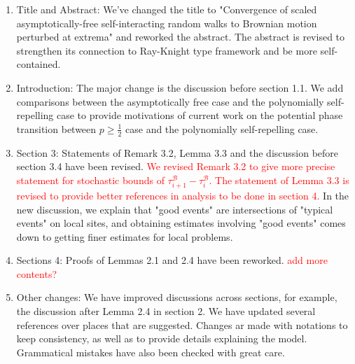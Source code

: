 \documentclass[11pt,a4paper]{article}
\numberwithin{equation}{section}
\def\TBF#1{\textcolor{red}{#1}} %
\begin{document}
	\begin{enumerate}
		\item Title and Abstract: We've changed the title to "Convergence of scaled asymptotically-free
		self-interacting random walks to Brownian motion
		perturbed at extrema" and reworked the abstract. The abstract is revised to strengthen its connection to Ray-Knight type framework and be more self-contained.
		
		\item Introduction: The major change is the discussion before section 1.1. We add comparisons between the asymptotically free case and the polynomially self-repelling case to provide motivations of current work on the potential phase transition between $p\geq \frac{1}{2}$ case and the polynomially self-repelling case.
		
		\item Section 3:  Statements of Remark 3.2, Lemma 3.3 and the discussion before section 3.4 have been revised. \TBF{We revised Remark 3.2 to give more precise statement for stochastic bounds of $\tau_{i+1}^{\mathcal{B}}-\tau_{i}^{\mathcal{B}}$. The statement of Lemma 3.3 is revised to provide better references in analysis to be done in section 4.}
		In the new discussion, we explain that "good events" are intersections of "typical events" on local sites, and obtaining estimates involving "good events" comes down to getting finer estimates for local problems.
		
		
		
		\item Sections 4: Proofs of Lemmas 2.1 and 2.4 have been reworked. \TBF{add more contents?}
		
		\item Other changes: We have improved discussions across sections, for example, the discussion after Lemma 2.4 in section 2. We have updated several references over places that are suggested. Changes ar made with notations to keep consistency, as well as to provide details explaining the model. Grammatical mistakes have also been checked with great care.  
		
	\end{enumerate}
	
	
	
	\newpage
\end{document}
